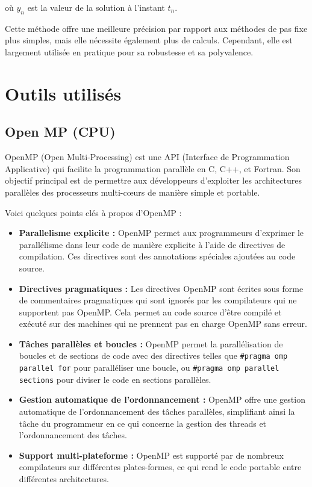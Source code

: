 \documentclass[10pt,a4paper]{article}
\begin{document}
où $y_n$ est la valeur de la solution à l'instant $t_n$.

Cette méthode offre une meilleure précision par rapport aux méthodes de pas fixe plus simples, mais elle nécessite également plus de calculs. Cependant, elle est largement utilisée en pratique pour sa robustesse et sa polyvalence.


\section{Outils utilisés}

\subsection{Open MP (CPU)}

OpenMP (Open Multi-Processing) est une API (Interface de Programmation Applicative) qui facilite la programmation parallèle en C, C++, et Fortran. Son objectif principal est de permettre aux développeurs d'exploiter les architectures parallèles des processeurs multi-cœurs de manière simple et portable.

Voici quelques points clés à propos d'OpenMP :

\begin{itemize}

    \item \textbf{Parallelisme explicite :} OpenMP permet aux programmeurs d'exprimer le parallélisme dans leur code de manière explicite à l'aide de directives de compilation. Ces directives sont des annotations spéciales ajoutées au code source.
    
    \item \textbf{Directives pragmatiques :} Les directives OpenMP sont écrites sous forme de commentaires pragmatiques qui sont ignorés par les compilateurs qui ne supportent pas OpenMP. Cela permet au code source d'être compilé et exécuté sur des machines qui ne prennent pas en charge OpenMP sans erreur.
    
    \item \textbf{Tâches parallèles et boucles :} OpenMP permet la parallélisation de boucles et de sections de code avec des directives telles que \verb|#pragma omp parallel for| pour paralléliser une boucle, ou \verb|#pragma omp parallel sections| pour diviser le code en sections parallèles.
    
    \item \textbf{Gestion automatique de l'ordonnancement :} OpenMP offre une gestion automatique de l'ordonnancement des tâches parallèles, simplifiant ainsi la tâche du programmeur en ce qui concerne la gestion des threads et l'ordonnancement des tâches.
    
    \item \textbf{Support multi-plateforme :} OpenMP est supporté par de nombreux compilateurs sur différentes plates-formes, ce qui rend le code portable entre différentes architectures.

\end{itemize}
\end{document}
